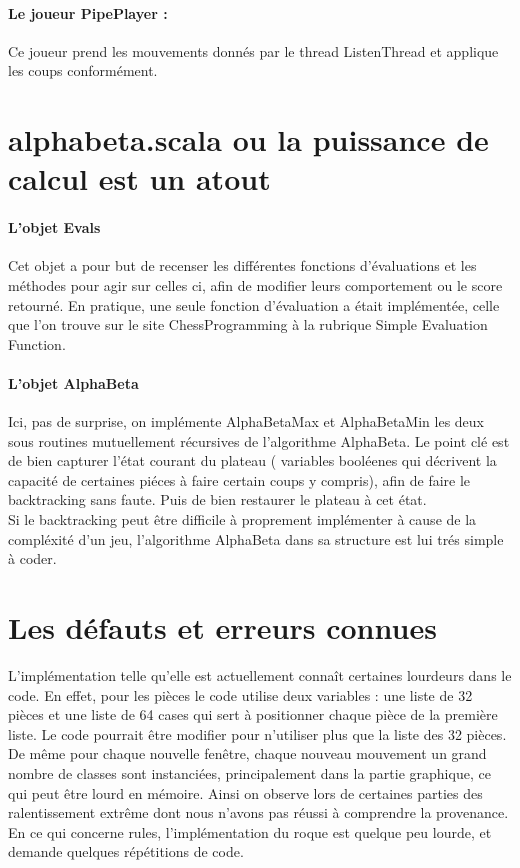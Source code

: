 \documentclass[a4paper]{article}
\begin{document}
\paragraph{Le joueur PipePlayer :}Ce joueur prend les mouvements donnés par le thread ListenThread et applique les coups conformément. 

\section{alphabeta.scala ou la puissance de calcul est un atout}

\paragraph{L'objet Evals}Cet objet a pour but de recenser  les différentes fonctions d'évaluations et les méthodes pour agir sur celles ci, afin de modifier leurs comportement ou le score retourné. En pratique, une seule fonction d'évaluation a était implémentée, celle que l'on trouve sur le site ChessProgramming à la rubrique Simple Evaluation Function.

\paragraph{L'objet AlphaBeta} Ici, pas de surprise, on implémente AlphaBetaMax et AlphaBetaMin les deux sous routines mutuellement récursives de l'algorithme AlphaBeta. Le point clé est de bien capturer l'état courant du plateau ( variables booléenes qui décrivent la capacité de certaines piéces à faire certain coups y compris), afin de faire le backtracking sans faute. Puis de bien restaurer le plateau à cet état.\\
Si le backtracking peut être difficile à proprement implémenter à cause de la compléxité d'un jeu, l'algorithme AlphaBeta dans sa structure est lui trés simple à coder.  

\section{Les défauts et erreurs connues}

L'implémentation telle qu'elle est actuellement connaît certaines lourdeurs dans le code. En effet, pour les pièces le code utilise deux variables : une liste de 32 pièces et une liste de 64 cases qui sert à positionner chaque pièce de la première liste. Le code pourrait être modifier pour n'utiliser plus que la liste des 32 pièces. \\

De même pour chaque nouvelle fenêtre, chaque nouveau mouvement un grand nombre de classes sont instanciées, principalement dans la partie graphique, ce qui peut être lourd en mémoire. Ainsi on observe lors de certaines parties des ralentissement extrême dont nous n'avons pas réussi à comprendre la provenance. \\ 

En ce qui concerne rules, l'implémentation du roque est quelque peu lourde, et demande quelques répétitions de code. \\
\end{document}
